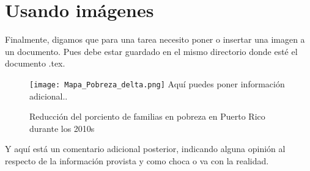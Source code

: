 \documentclass[11pt]{article} %
\begin{document}
\section*{Usando imágenes}


Finalmente, digamos que para una tarea necesito poner o insertar una imagen a un documento. Pues debe estar guardado en el mismo directorio donde esté el documento .tex. 

\begin{figure}[h!]
  \begin{center}
  \caption{Reducción del porciento de familias en pobreza en Puerto Rico durante los 2010s}
    \texttt{[image: Mapa\_Pobreza\_delta.png]}
Aquí puedes poner información adicional..
\end{center}
\end{figure}

Y aquí está un comentario adicional posterior, indicando alguna opinión al respecto de la información provista y como choca o va con la realidad.
\end{document}
